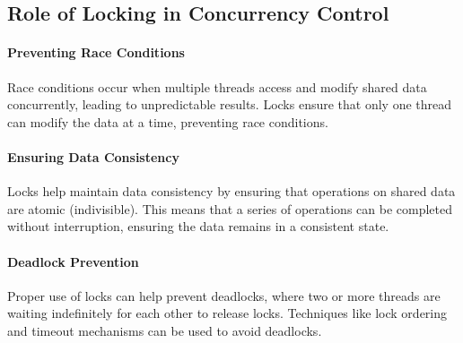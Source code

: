 \subsection{Role of Locking in Concurrency Control}
\paragraph{Preventing Race Conditions}

Race conditions occur when multiple threads access and modify shared data concurrently, leading to unpredictable results.
Locks ensure that only one thread can modify the data at a time, preventing race conditions.

\paragraph{Ensuring Data Consistency}

Locks help maintain data consistency by ensuring that operations on shared data are atomic (indivisible).
This means that a series of operations can be completed without interruption, ensuring the data remains in a consistent state.

\paragraph{Deadlock Prevention}

Proper use of locks can help prevent deadlocks, where two or more threads are waiting indefinitely for each other to release locks.
Techniques like lock ordering and timeout mechanisms can be used to avoid deadlocks.







